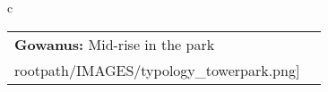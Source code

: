 \begin{table}[H]
        \begin{tabular}{c}
        \begin{tabular}{m{1.5in} m{2in}}
\textbf{Gowanus:} {Mid-rise in the park} & \texttt{[image: \\rootpath/IMAGES/typology\_towerpark.png]}
\end{tabular}\end{tabular}
        \end{table}